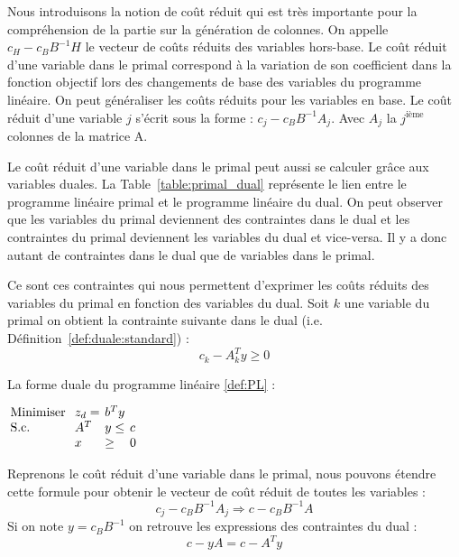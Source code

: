 Nous introduisons la notion de coût réduit qui est très importante pour la compréhension de la partie sur la génération de colonnes.
On appelle $c_H - c_BB^{-1}H$ le vecteur de coûts réduits des variables hors-base.
Le coût réduit d'une variable dans le primal correspond à la variation de son coefficient dans la fonction objectif lors des changements de base des variables du programme linéaire. 
On peut généraliser les coûts réduits pour les variables en base.
Le coût réduit d'une variable $j$ s'écrit sous la forme : $c_j - c_BB^{-1}A_j$.
Avec $A_j$ la $j^{\text{ième}}$ colonnes de la matrice A.

Le coût réduit d'une variable dans le primal peut aussi se calculer grâce aux variables duales.
La Table~\ref{table:primal_dual} représente le lien entre le programme linéaire primal et le programme linéaire du dual. 
On peut observer que les variables du primal deviennent des contraintes dans le dual et les contraintes du primal deviennent les variables du dual et vice-versa.
Il y a donc autant de contraintes dans le dual que de variables dans le primal.


Ce sont ces contraintes qui nous permettent d'exprimer les coûts réduits des variables du primal en fonction des variables du dual. Soit $k$ une variable du primal on obtient la contrainte suivante dans le dual (i.e. Définition~\ref{def:duale:standard}) :
$$
c_k - A_k^Ty \geq 0
$$



\begin{mydef}
La forme duale du programme linéaire \ref{def:PL} : \\
\begin{center}
$
\arraycolsep=2pt
\begin{array}{llll}
\text{Minimiser } & z_d =& b^Ty &\\
\text{S.c. } & A^T  & y\leq & c \\
& x & \geq & 0\\
\end{array}
$
\end{center}
\label{def:duale:standard}
\end{mydef}

Reprenons le coût réduit d'une variable dans le primal, nous pouvons étendre cette formule pour obtenir le vecteur de coût réduit de toutes les variables :
$$c_j - c_BB^{-1}A_j \Rightarrow c-c_BB^{-1}A$$
Si on note $y = c_BB^{-1}$  on retrouve les expressions des contraintes du dual :
$$ c-y A = c-A^Ty$$


